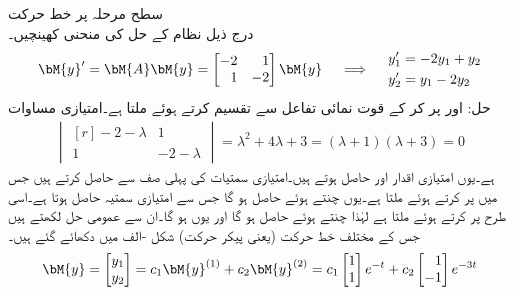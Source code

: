 \quad سطح مرحلہ پر خط حرکت\\
درج ذیل نظام کے حل کی منحنی کھینچیں۔
\begin{gather}\label{مساوات_نظام_خط_حرکت_الف}
\begin{aligned}
\bM{y}'=\bM{A}\bM{y}=\begin{bmatrix*}[r] -2& 1\\ 1&-2 \end{bmatrix*}\bM{y}
\end{aligned}\quad \implies \quad
\begin{aligned}
y_1'&=-2y_1+y_2\\
y_2'&=y_1-2y_2
\end{aligned}
\end{gather}
حل: اور  پر کر کے قوت نمائی تفاعل سے تقسیم کرتے ہوئے  ملتا ہے۔امتیازی مساوات
\begin{align*}
\begin{vmatrix*}[r]
-2-\lambda& 1\\
1& -2-\lambda
\end{vmatrix*}=\lambda^2+4\lambda+3=(\lambda+1)(\lambda+3)=0
\end{align*}
ہے۔یوں امتیازی اقدار  اور  حاصل ہوتے ہیں۔امتیازی سمتیات   کی پہلی صف  سے حاصل کرتے ہیں جس میں  پر کرتے ہوئے  ملتا ہے۔یوں  چنتے ہوئے  حاصل ہو گا جس سے امتیازی سمتیہ  حاصل ہوتا ہے۔اسی طرح  پر کرتے ہوئے  ملتا ہے لہٰذا  چنتے ہوئے  حاصل ہو گا اور یوں  ہو گا۔ان سے عمومی حل لکھتے ہیں جس کے مختلف خط حرکت (یعنی پیکر حرکت) شکل -الف میں دکھائے گئے ہیں۔
\begin{align*}
\bM{y}=\begin{bmatrix} y_1 \\y_2 \end{bmatrix}=c_1\bM{y}^{(1)}+c_2\bM{y}^{(2)}=c_1\begin{bmatrix} 1 \\ 1 \end{bmatrix}e^{-t}+c_2\begin{bmatrix*}[r] 1\\ -1 \end{bmatrix*}e^{-3t}
\end{align*}
